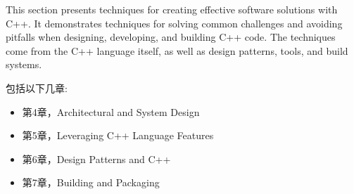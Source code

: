 
This section presents techniques for creating effective software solutions with C++. It demonstrates techniques for solving common challenges and avoiding pitfalls when designing, developing, and building C++ code. The techniques come from the C++ language itself, as well as design patterns, tools, and build systems.

包括以下几章:

\begin{itemize}
\item 第4章，Architectural and System Design
\item 第5章，Leveraging C++ Language Features
\item 第6章，Design Patterns and C++
\item 第7章，Building and Packaging
\end{itemize}